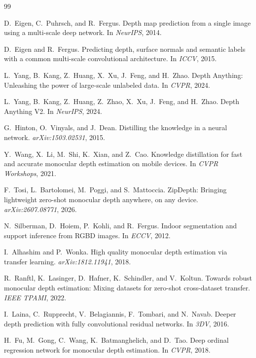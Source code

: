 \documentclass[11pt]{article}
\begin{document}
\begin{thebibliography}{99}
\footnotesize
\setlength{\itemsep}{0pt}

D.~Eigen, C.~Puhrsch, and R.~Fergus.
Depth map prediction from a single image using a multi-scale deep network.
In \emph{NeurIPS}, 2014.

D.~Eigen and R.~Fergus.
Predicting depth, surface normals and semantic labels with a common multi-scale convolutional
architecture.
In \emph{ICCV}, 2015.

L.~Yang, B.~Kang, Z.~Huang, X.~Xu, J.~Feng, and H.~Zhao.
Depth Anything: Unleashing the power of large-scale unlabeled data.
In \emph{CVPR}, 2024.

L.~Yang, B.~Kang, Z.~Huang, Z.~Zhao, X.~Xu, J.~Feng, and H.~Zhao.
Depth Anything V2.
In \emph{NeurIPS}, 2024.

G.~Hinton, O.~Vinyals, and J.~Dean.
Distilling the knowledge in a neural network.
\emph{arXiv:1503.02531}, 2015.

Y.~Wang, X.~Li, M.~Shi, K.~Xian, and Z.~Cao.
Knowledge distillation for fast and accurate monocular depth estimation on mobile devices.
In \emph{CVPR Workshops}, 2021.

F.~Tosi, L.~Bartolomei, M.~Poggi, and S.~Mattoccia.
ZipDepth: Bringing lightweight zero-shot monocular depth anywhere, on any device.
\emph{arXiv:2607.08771}, 2026.

N.~Silberman, D.~Hoiem, P.~Kohli, and R.~Fergus.
Indoor segmentation and support inference from RGBD images.
In \emph{ECCV}, 2012.

I.~Alhashim and P.~Wonka.
High quality monocular depth estimation via transfer learning.
\emph{arXiv:1812.11941}, 2018.

R.~Ranftl, K.~Lasinger, D.~Hafner, K.~Schindler, and V.~Koltun.
Towards robust monocular depth estimation: Mixing datasets for zero-shot cross-dataset transfer.
\emph{IEEE TPAMI}, 2022.

I.~Laina, C.~Rupprecht, V.~Belagiannis, F.~Tombari, and N.~Navab.
Deeper depth prediction with fully convolutional residual networks.
In \emph{3DV}, 2016.

H.~Fu, M.~Gong, C.~Wang, K.~Batmanghelich, and D.~Tao.
Deep ordinal regression network for monocular depth estimation.
In \emph{CVPR}, 2018.


\end{thebibliography}
\end{document}
